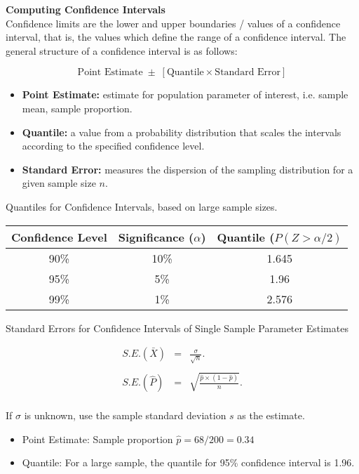 \begin{framed}

\noindent \textbf{Computing Confidence Intervals}\\
Confidence limits are the lower and upper boundaries / values of a confidence interval, that is, the values which define the range of a confidence interval. The general structure of a confidence interval is as follows:

\[ \mbox{Point Estimate} \; \pm \; \left[ \mbox{Quantile} \times \mbox{Standard Error} \right] \]


\begin{itemize}
\item \textbf{Point Estimate:} estimate for population parameter of interest, i.e. sample mean, sample proportion.
\item \textbf{Quantile:} a value from a probability distribution that scales the intervals according to the specified confidence level.
\item \textbf{Standard Error:} measures the dispersion of the sampling distribution for a given sample size $n$.
\end{itemize}


\end{framed}
\noindent 

\noindent Quantiles for Confidence Intervals, based on large sample sizes.
\begin{tabular}{|c|c|c|} \hline
Confidence Level & Significance ($\alpha$) & Quantile ($P(Z > \alpha/2)$\\ \hline
90\%  & 10\% & 1.645 \\ \hline 
95\% & 5\%& 1.96\\ \hline 
99\% & 1\% & 2.576\\ \hline 
\end{tabular}

\noindent Standard Errors for Confidence Intervals of Single Sample Parameter Estimates


\begin{eqnarray*} S.E.(\bar{X})&=&\frac{\sigma}{\sqrt{n}}.\\\\
	S.E.(\hat{P})&=&\sqrt{\frac{\hat{p}\times(1-\hat{p})}{n}}.\\
\end{eqnarray*}

If $\sigma$ is unknown, use the sample standard deviation $s$ as the estimate.


\begin{itemize}
    \item Point Estimate: Sample proportion $\hat{p} = 68/200 = 0.34$
    \item Quantile: For a large sample, the quantile for 95\% confidence interval is 1.96.
\end{itemize}
